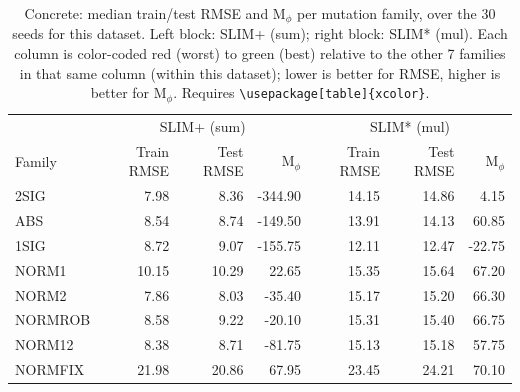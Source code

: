 \begin{table}[t]
\centering
\caption{Concrete: median train/test RMSE and M$_\phi$ per mutation family, over the 30 seeds for this dataset. Left block: SLIM+ (sum); right block: SLIM* (mul). Each column is color-coded red (worst) to green (best) relative to the other 7 families in that same column (within this dataset); lower is better for RMSE, higher is better for M$_\phi$. Requires \texttt{\textbackslash usepackage[table]\{xcolor\}}.}
\label{tab:summary-median-performance-concrete}
\begin{tabular}{lrrr|rrr}
\toprule
& \multicolumn{3}{c|}{SLIM+ (sum)} & \multicolumn{3}{c}{SLIM* (mul)} \\
Family & Train RMSE & Test RMSE & M$_\phi$ & Train RMSE & Test RMSE & M$_\phi$ \\
\midrule
2SIG & \cellcolor[HTML]{B0DBB0}7.98 & \cellcolor[HTML]{B2DCB0}8.36 & \cellcolor[HTML]{FAAAA5}-344.90 & \cellcolor[HTML]{CBE5AD}14.15 & \cellcolor[HTML]{CFE6AC}14.86 & \cellcolor[HTML]{FDD6A6}4.15 \\
ABS & \cellcolor[HTML]{B6DEAF}8.54 & \cellcolor[HTML]{B7DEAF}8.74 & \cellcolor[HTML]{FFF2A7}-149.50 & \cellcolor[HTML]{C8E4AD}13.91 & \cellcolor[HTML]{C5E3AE}14.13 & \cellcolor[HTML]{BEE0AE}60.85 \\
1SIG & \cellcolor[HTML]{B8DEAF}8.72 & \cellcolor[HTML]{BBDFAF}9.07 & \cellcolor[HTML]{FFF0A7}-155.75 & \cellcolor[HTML]{AEDBB0}12.11 & \cellcolor[HTML]{AEDBB0}12.47 & \cellcolor[HTML]{FAAAA5}-22.75 \\
NORM1 & \cellcolor[HTML]{C9E4AD}10.15 & \cellcolor[HTML]{CBE5AD}10.29 & \cellcolor[HTML]{C0E1AE}22.65 & \cellcolor[HTML]{DDEAAB}15.35 & \cellcolor[HTML]{DAEAAB}15.64 & \cellcolor[HTML]{B3DDB0}67.20 \\
NORM2 & \cellcolor[HTML]{AEDBB0}7.86 & \cellcolor[HTML]{AEDBB0}8.03 & \cellcolor[HTML]{D7E9AC}-35.40 & \cellcolor[HTML]{DAEAAB}15.17 & \cellcolor[HTML]{D4E8AC}15.20 & \cellcolor[HTML]{B5DDAF}66.30 \\
NORMROB & \cellcolor[HTML]{B7DEAF}8.58 & \cellcolor[HTML]{BDE0AF}9.22 & \cellcolor[HTML]{D1E7AC}-20.10 & \cellcolor[HTML]{DCEAAB}15.31 & \cellcolor[HTML]{D7E9AC}15.40 & \cellcolor[HTML]{B4DDB0}66.75 \\
NORM12 & \cellcolor[HTML]{B4DDB0}8.38 & \cellcolor[HTML]{B7DEAF}8.71 & \cellcolor[HTML]{E9EFA9}-81.75 & \cellcolor[HTML]{D9E9AB}15.13 & \cellcolor[HTML]{D4E7AC}15.18 & \cellcolor[HTML]{C4E2AE}57.75 \\
NORMFIX & \cellcolor[HTML]{FAAAA5}21.98 & \cellcolor[HTML]{FAAAA5}20.86 & \cellcolor[HTML]{AEDBB0}67.95 & \cellcolor[HTML]{FAAAA5}23.45 & \cellcolor[HTML]{FAAAA5}24.21 & \cellcolor[HTML]{AEDBB0}70.10 \\
\bottomrule
\end{tabular}
\end{table}

